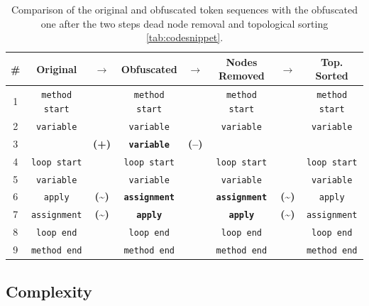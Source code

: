 \begin{table}
    \centering
    \begin{tabular}{c@{\hskip 12pt}c@{\hskip 4pt}c@{\hskip 4pt}c@{\hskip 4pt}c@{\hskip 4pt}c@{\hskip 4pt}c@{\hskip 4pt}c}
        \toprule
        \# & \textbf{Original} & $\to$ & \textbf{Obfuscated} & $\to$ & \textbf{Nodes Removed} & $\to$ & \textbf{Top. Sorted} \\
        \midrule
        {1}  & \texttt{method start} & & \texttt{method start} & & \texttt{method start} & & \texttt{method start} \\
        {2}  & \texttt{variable}     & & \texttt{variable}     & & \texttt{variable}     & & \texttt{variable}     \\
        {3}  &                                  & \textbf{(+)} & \texttt{\textbf{variable}}     & \textbf{(--)} & & &  \\
        {4}  & \texttt{loop start}   & & \texttt{loop start}   & & \texttt{loop start}   & & \texttt{loop start}   \\
        {5}  & \texttt{variable}     & & \texttt{variable}     & & \texttt{variable}     & & \texttt{variable}     \\
        {6}  & \texttt{apply}        & \textbf{(\textasciitilde)} & \texttt{\textbf{assignment}}   & & \texttt{\textbf{assignment}}   & \textbf{(\textasciitilde)}& \texttt{apply}   \\
        {7}  & \texttt{assignment}   & \textbf{(\textasciitilde)} & \texttt{\textbf{apply}}        & & \texttt{\textbf{apply}}        & \textbf{(\textasciitilde)}& \texttt{assignment}        \\
        {8}  & \texttt{loop end}     & & \texttt{loop end}     & & \texttt{loop end}     & & \texttt{loop end}     \\
        {9}  & \texttt{method end}   & & \texttt{method end}   & & \texttt{method end}   & & \texttt{method end}   \\
        \bottomrule
    \end{tabular}
    \caption[Token Sequence Normalization]{Comparison of the original and obfuscated token sequences with the obfuscated one after the two steps dead node removal and topological sorting \autoref{tab:codesnippet}.}
    \label{tab:tokens-full}
\end{table}


\subsection{Complexity}

